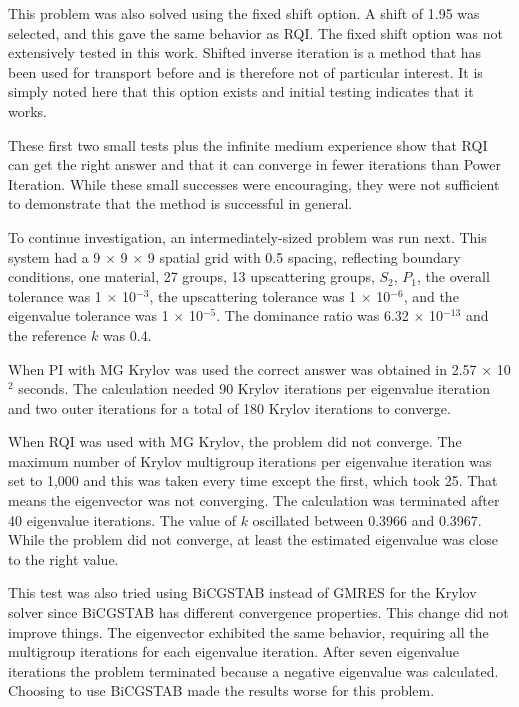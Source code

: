 This problem was also solved using the fixed shift option. A shift of 1.95 was selected, and this gave the same behavior as RQI. The fixed shift option was not extensively tested in this work. Shifted inverse iteration is a method that has been used for transport before and is therefore not of particular interest. It is simply noted here that this option exists and initial testing indicates that it works. 

These first two small tests plus the infinite medium experience show that RQI can get the right answer and that it can converge in fewer iterations than Power Iteration. While these small successes were encouraging, they were not sufficient to demonstrate that the method is successful in general. 

To continue investigation, an intermediately-sized problem was run next. This system had a 9 $\times$ 9 $\times$ 9 spatial grid with 0.5 spacing, reflecting boundary conditions, one material, 27 groups, 13 upscattering groups, $S_{2}$, $P_{1}$, the overall tolerance was 1 $\times$ 10$^{-3}$, the upscattering tolerance was 1 $\times$ 10$^{-6}$, and the eigenvalue tolerance was 1 $\times$ 10$^{-5}$. The dominance ratio was 6.32 $\times$ 10$^{-13}$ and the reference $k$ was 0.4. 

When PI with MG Krylov was used the correct answer was obtained in 2.57 $\times$ 10$^{2}$ seconds. The calculation needed 90 Krylov iterations per eigenvalue iteration and two outer iterations for a total of 180 Krylov iterations to converge. 

When RQI was used with MG Krylov, the problem did not converge. The maximum number of Krylov multigroup iterations per eigenvalue iteration was set to 1,000 and this was taken every time except the first, which took 25. That means the eigenvector was not converging. The calculation was terminated after 40 eigenvalue iterations. The value of $k$ oscillated between 0.3966 and 0.3967. While the problem did not converge, at least the estimated eigenvalue was close to the right value.

This test was also tried using BiCGSTAB instead of GMRES for the Krylov solver since BiCGSTAB has different convergence properties. This change did not improve things. The eigenvector exhibited the same behavior, requiring all the multigroup iterations for each eigenvalue iteration. After seven eigenvalue iterations the problem terminated because a negative eigenvalue was calculated. Choosing to use BiCGSTAB made the results worse for this problem. 

